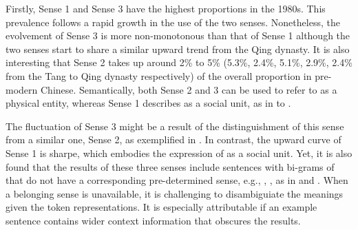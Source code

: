 Firstly, Sense 1 and Sense 3 have the highest proportions in the 1980s. This prevalence follows a rapid growth in the use of the two senses. Nonetheless, the evolvement of Sense 3 is more non-monotonous than that of Sense 1 although the two senses start to share a similar upward trend from the Qing dynasty. It is also interesting that Sense 2 takes up around 2\% to 5\% (5.3\%, 2.4\%, 5.1\%, 2.9\%, 2.4\% from the Tang to Qing dynasty respectively) of the overall proportion in pre-modern Chinese. Semantically, both Sense 2 and 3 can be used to refer to \jia as a physical entity, whereas Sense 1 describes \jia as a social unit, as in  to . 

The fluctuation of Sense 3 might be a result of the distinguishment of this sense from a similar one, Sense 2, as exemplified in .  In contrast, the upward curve of Sense 1 is sharpe, which embodies the expression of \jia as a social unit. Yet, it is also found that the results of these three senses include sentences with bi-grams of \jia that do not have a corresponding pre-determined sense, e.g., , , as in  and . When a belonging sense is unavailable, it is challenging to disambiguiate the meanings given the token representations. It is especially attributable if an example sentence contains wider context information that obscures the results.

\begin{exe}
\end{exe}

